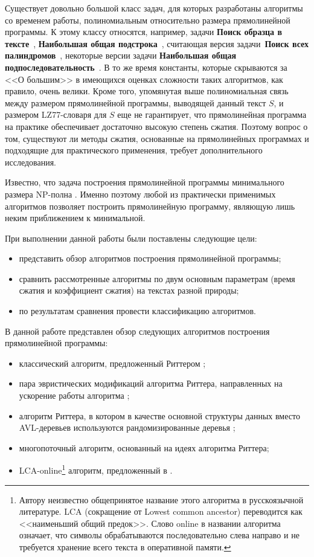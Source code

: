 \documentclass[14pt]{article}
\begin{document}
Существует довольно большой класс задач, для которых разработаны алгоритмы со временем работы, полиномиальным
относительно размера прямолинейной программы. К этому классу относятся, например, задачи \textbf{Поиск образца в тексте}~\cite{PM_and_HD},
\textbf{Наибольшая общая подстрока}~\cite{LCSubstring}, считающая версия задачи~\textbf{Поиск всех палиндромов}~\cite{LCSubstring},
некоторые версии задачи \textbf{Наибольшая общая подпоследовательность}~\cite{LCS_P}. В то же время константы,
которые скрываются за <<О большим>> в имеющихся оценках сложности таких алгоритмов, как правило, очень велики.
Кроме того, упомянутая выше полиномиальная связь между размером прямолинейной программы, выводящей данный текст $S$, и размером
LZ77-словаря для $S$ еще не гарантирует, что прямолинейная программа на практике обеспечивает достаточно высокую степень сжатия.
Поэтому вопрос о том, существуют ли методы сжатия, основанные на прямолинейных программах и подходящие для практического применения,
требует дополнительного исследования.

Известно, что задача построения прямолинейной программы минимального размера NP-полна \cite{SmallestCFG}. Именно поэтому
любой из практически применимых алгоритмов позволяет построить прямолинейную программу, являющую лишь неким приближением к минимальной.

При выполнении данной работы были поставлены следующие цели:
\begin{itemize}
	\item представить обзор алгоритмов построения прямолинейной программы;
	\item сравнить рассмотренные алгоритмы по двум основным параметрам (время сжатия и коэффициент сжатия) на текстах разной природы;
	\item по результатам сравнения провести классификацию алгоритмов.
\end{itemize}

В данной работе представлен обзор следующих алгоритмов построения прямолинейной программы:
\begin{itemize} 
	\item классический алгоритм, предложенный Риттером \cite{RytterSLPConstruction};
	\item пара эвристических модификаций алгоритма Риттера, направленных на ускорение работы алгоритма \cite{ModernRytterAlgorithm};
	\item алгоритм Риттера, в котором в качестве основной структуры данных вместо AVL-деревьев
		используются рандомизированные деревья \cite{OurPracticalTest};
	\item многопоточный алгоритм, основанный на идеях алгоритма Риттера;
	\item LCA-online\footnote{Автору неизвестно общепринятое название этого алгоритма в русскоязычной литературе.
	LCA (сокращение от Lowest common ancestor) переводится как <<наименьший общий предок>>. Слово online в названии алгоритма
	означает, что символы обрабатываются последовательно слева направо и не требуется хранение всего текста в оперативной памяти.}
	алгоритм, предложенный в \cite{LCAOnlineSLP}.
\end{itemize}
\end{document}

